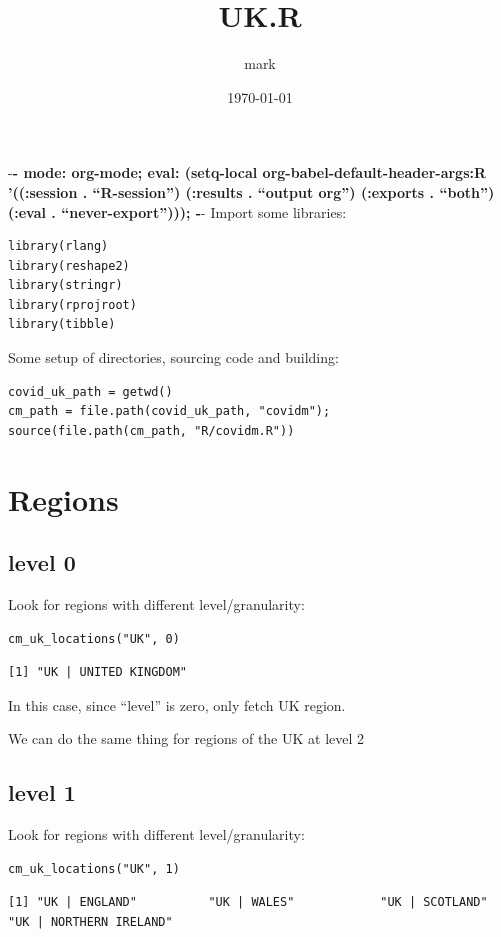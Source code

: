 \documentclass[11pt]{article}
\author{mark}
\date{\today}
\title{UK.R}
\begin{document}
\maketitle
\tableofcontents

-\textbf{- mode: org-mode; eval: (setq-local org-babel-default-header-args:R '((:session . ``R-session'') (:results . ``output org'') (:exports . ``both'') (:eval . ``never-export''))); -}-
Import some libraries:
\begin{verbatim}
library(rlang)
library(reshape2)
library(stringr)
library(rprojroot)
library(tibble)
\end{verbatim}

Some setup of directories, sourcing code and building:
\begin{verbatim}
covid_uk_path = getwd()
cm_path = file.path(covid_uk_path, "covidm");
source(file.path(cm_path, "R/covidm.R"))

\end{verbatim}

\section{Regions}
\label{sec:org4773db7}
\subsection{level 0}
\label{sec:org1c4a0f0}
Look for regions with different level/granularity:
\begin{verbatim}
cm_uk_locations("UK", 0)
\end{verbatim}

\begin{verbatim}
[1] "UK | UNITED KINGDOM"
\end{verbatim}

In this case, since ``level'' is zero, only fetch UK region.

We can do the same thing for regions of the UK at level 2
\subsection{level 1}
\label{sec:org0c9cb6b}
Look for regions with different level/granularity:
\begin{verbatim}
cm_uk_locations("UK", 1)
\end{verbatim}

\begin{verbatim}
[1] "UK | ENGLAND"          "UK | WALES"            "UK | SCOTLAND"         "UK | NORTHERN IRELAND"
\end{verbatim}
\end{document}
